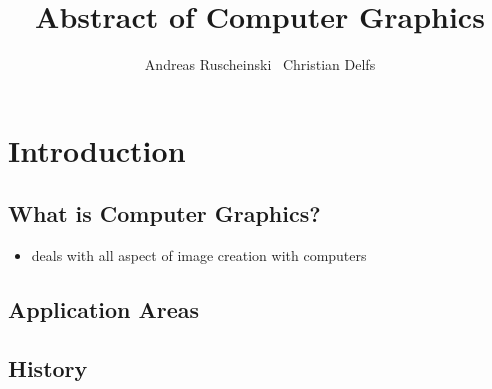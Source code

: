 \documentclass[11pt,a4paper]{article}
\title{Abstract of Computer Graphics}
\author{Andreas Ruscheinski \ Christian Delfs}
\date{}
\begin{document}
\maketitle

\section{Introduction}
	\subsection{What is Computer Graphics?}
		\begin{itemize}
			\item deals with all aspect of image creation with computers
		\end{itemize}
	\subsection{Application Areas}
	\subsection{History}
\end{document}
